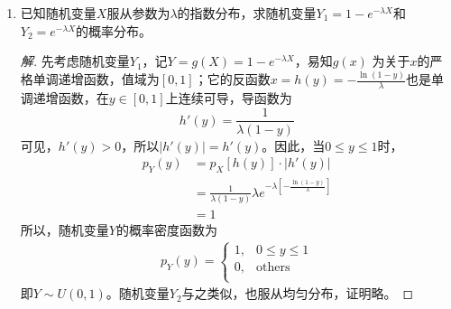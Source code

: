 \documentclass[12pt]{article}
\newcommand{\hei}{\CJKfamily{hei}}                          %
\begin{document}
\begin{enumerate}
\item {\hei 已知随机变量$ X $服从参数为$ \lambda $的指数分布，求随机变量$ {Y_1}=1-{{e}^{-\lambda X}} $和$ {Y_2}={{e}^{-\lambda X}} $的概率分布。}
\begin{proof}[解]
	先考虑随机变量$ {Y_1} $，记$ Y=g(X)=1-{{e}^{-\lambda X}} $，易知$ g(x) $ 为关于$ x $的严格单调递增函数，值域为$ [0,1] $；它的反函数$ x=h(y)=\displaystyle{-\frac{\ln \left( 1-y \right)}{\lambda }} $也是单调递增函数，在$ y\in \left[ 0,1 \right] $上连续可导，导函数为
	\begin{equation}
		{h}'\left( y \right)=\displaystyle{\frac{1}{\lambda \left( 1-y \right)}}
	\end{equation}
	可见，$ {h}'\left( y \right)>0 $，所以$ \left| {h}'\left( y \right) \right|={h}'\left( y \right) $。因此，当$ 0\le y\le 1 $时，
	\begin{equation}
		\begin{aligned}
		 {{p}_{Y}}\left( y \right)&={{p}_{X}}\left[ h\left( y \right) \right]\cdot\left|{h}'\left( y \right)\right| \\ 
		& =\frac{1 }{\lambda \left( 1-y \right)}\lambda{{e}^{-\lambda \left[ -\frac{\ln \left( 1-y \right)}{\lambda } \right]}} \\ 
		& =1  
		\end{aligned}
	\end{equation}
	所以，随机变量$ Y $的概率密度函数为
	\begin{equation}
		\begin{aligned}
			{{p}_{Y}}\left( y \right)=\left\{ \begin{matrix}
			1,&0\le y\le 1  \\
			0,&\text{others}  \\
			\end{matrix} \right.
		\end{aligned}
	\end{equation}
	即$ Y\sim U\left( 0,1 \right) $。随机变量$ {Y_2} $与之类似，也服从均匀分布，证明略。
\end{proof}




\end{enumerate}
\end{document}
